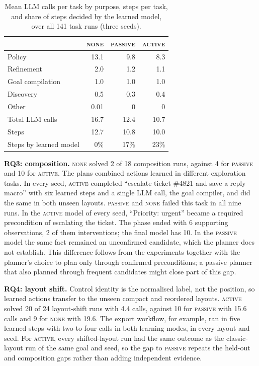 \documentclass[conference]{IEEEtran}
\newcommand{\modeNone}{\textsc{none}}
\newcommand{\modePassive}{\textsc{passive}}
\newcommand{\modeActive}{\textsc{active}}
\begin{document}
\begin{table}[t]
\centering
\caption{Mean LLM calls per task by purpose, steps per task, and share of steps decided by the learned model, over all 141 task runs (three seeds).}
\label{tab:cost}
\begin{tabular}{l rrr}
\toprule
& \modeNone & \modePassive & \modeActive \\
\midrule
Policy                     & 13.1 & 9.8 & 8.3 \\
Refinement                 & 2.0  & 1.2 & 1.1 \\
Goal compilation           & 1.0  & 1.0 & 1.0 \\
Discovery                  & 0.5  & 0.3 & 0.4 \\
Other                      & 0.01 & 0   & 0   \\
\midrule
Total LLM calls            & 16.7 & 12.4 & 10.7 \\
Steps                      & 12.7 & 10.8 & 10.0 \\
Steps by learned model     & 0\%  & 17\% & 23\% \\
\bottomrule
\end{tabular}
\end{table}

\textbf{RQ3: composition.} %
\modeNone{} solved 2 of 18 composition runs, against 4 for \modePassive{} and 10 for \modeActive{}. The plans combined actions learned in different exploration tasks. In every seed, \modeActive{} completed ``escalate ticket \#4821 and save a reply macro'' with six learned steps and a single LLM call, the goal compiler, and did the same in both unseen layouts. \modePassive{} and \modeNone{} failed this task in all nine runs. In the \modeActive{} model of every seed, ``Priority: urgent'' became a required precondition of escalating the ticket. The phase ended with 6 supporting observations, 2 of them interventions; the final model has 10. In the \modePassive{} model the same fact remained an unconfirmed candidate, which the planner does not establish. This difference follows from the experiments together with the planner's choice to plan only through confirmed preconditions; a passive planner that also planned through frequent candidates might close part of this gap.

\textbf{RQ4: layout shift.} %
Control identity is the normalised label, not the position, so learned actions transfer to the unseen compact and reordered layouts. \modeActive{} solved 20 of 24 layout-shift runs with 4.4 calls, against 10 for \modePassive{} with 15.6 calls and 9 for \modeNone{} with 19.6. The export workflow, for example, ran in five learned steps with two to four calls in both learning modes, in every layout and seed. For \modeActive{}, every shifted-layout run had the same outcome as the classic-layout run of the same goal and seed, so the gap to \modePassive{} repeats the held-out and composition gaps rather than adding independent evidence.
\end{document}
